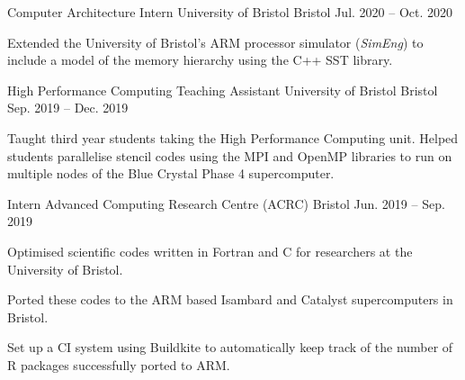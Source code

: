 \vspace{-1.1em}


\vspace{-0.2em}

\begin{cventries}

  \cventry
    {Computer Architecture Intern} %
    {University of Bristol} %
    {Bristol} %
    {Jul. 2020 -- Oct. 2020} %
    {
      \begin{cvitems} %
        \item {Extended the University of Bristol's ARM processor simulator (\textit{SimEng}) to include a model of the memory hierarchy using the C++ SST library.}
      \end{cvitems}
    }

  \cventry
    {High Performance Computing Teaching Assistant} %
    {University of Bristol} %
    {Bristol} %
    {Sep. 2019 -- Dec. 2019} %
    {
      \begin{cvitems} %
        \item {Taught third year students taking the High Performance Computing unit. Helped students parallelise stencil codes using the MPI and OpenMP libraries to run on multiple nodes of the Blue Crystal Phase 4 supercomputer.}
      \end{cvitems}
    }

  \cventry
    {Intern} %
    {Advanced Computing Research Centre (ACRC)} %
    {Bristol} %
    {Jun. 2019 -- Sep. 2019} %
    {
      \begin{cvitems} %
        \item {Optimised scientific codes written in Fortran and C for researchers at the University of Bristol.}
        \item {Ported these codes to the ARM based Isambard and Catalyst supercomputers in Bristol.}
        \item {Set up a CI system using Buildkite to automatically keep track of the number of R packages successfully ported to ARM.}
      \end{cvitems}
    }

\end{cventries}
